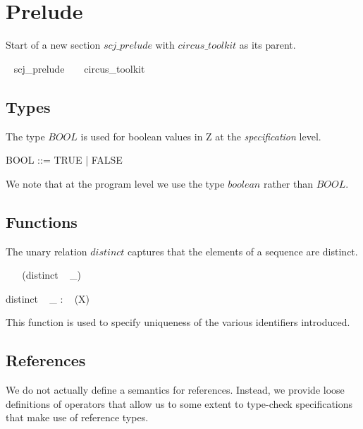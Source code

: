 \section{Prelude}

Start of a new section $scj\_prelude$ with $circus\_toolkit$ as its parent.
%
\begin{zsection}
  \SECTION ~ scj\_prelude ~ \parents ~ circus\_toolkit
\end{zsection}

\subsection{Types}


The type $BOOL$ is used for boolean values in Z at the \emph{specification} level.
%
\begin{zed}
  BOOL ::= TRUE | FALSE
\end{zed}
%
We note that at the program level we use the type $boolean$ rather than $BOOL$.

\subsection{Functions}

The unary relation $distinct$ captures that the elements of a sequence are distinct.
%
\begin{circusflow}
\begin{zed}
  \relation ~ ~ (distinct ~ \_)
\end{zed}
%
\begin{gendef}[X]
  distinct ~ \_ : \power ~ (\iseq X)
\end{gendef}
\end{circusflow}
%
This function is used to specify uniqueness of the various identifiers introduced.

\subsection{References}

We do not actually define a semantics for references. Instead, we provide loose definitions of operators that allow us to some extent to type-check specifications that make use of reference types.


